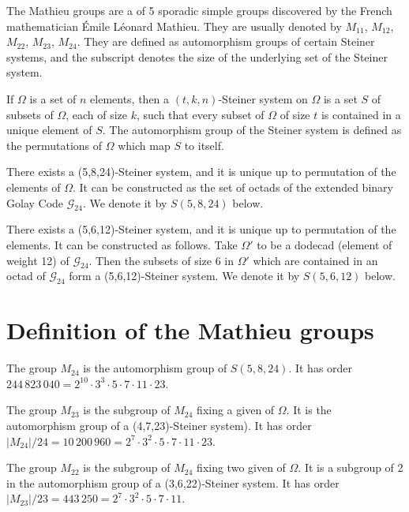 \documentclass[12pt]{article}
\newcommand{\gc}{\mathcal{G}_{24}}
\begin{document}

The Mathieu groups are a  of 5 sporadic simple groups discovered by the French mathematician \'Emile L\'eonard Mathieu.  They are usually denoted by $M_{11}$, $M_{12}$, $M_{22}$, $M_{23}$, $M_{24}$.  They are defined as automorphism groups of certain Steiner systems, and the subscript denotes the size of the underlying set of the Steiner system.

If $\Omega$ is a set of $n$ elements, then a $(t,k,n)$-Steiner system on $\Omega$ is a set $S$ of subsets of $\Omega$, each of size $k$, such that every subset of $\Omega$ of size $t$ is contained in a unique element of $S$.  The automorphism group of the Steiner system is defined as the permutations of $\Omega$ which map $S$ to itself.

There exists a (5,8,24)-Steiner system, and it is unique up to permutation of the elements of $\Omega$.  It can be constructed as the set of octads of the extended binary Golay Code $\gc$.  We denote it by $S(5,8,24)$ below.

There exists a (5,6,12)-Steiner system, and it is unique up to permutation of the elements.  It can be constructed as follows.  Take $\Omega'$ to be a dodecad (element of weight 12) of $\gc$.  Then the subsets of size 6 in $\Omega'$ which are contained in an octad of $\gc$ form a (5,6,12)-Steiner system.  We denote it by $S(5,6,12)$ below.

\section{Definition of the Mathieu groups}

The group $M_{24}$ is the automorphism group of $S(5,8,24)$.  It has order $244\,823\,040 = 2^{10} \cdot 3^3 \cdot 5 \cdot 7 \cdot 11 \cdot 23$.

The group $M_{23}$ is the subgroup of $M_{24}$ fixing a given  of $\Omega$.  It is the automorphism group of a (4,7,23)-Steiner system).  It has order $|M_{24}|/24 = 10\,200\,960 = 2^7 \cdot 3^2 \cdot 5 \cdot 7 \cdot 11 \cdot 23$.  

The group $M_{22}$ is the subgroup of $M_{24}$ fixing two given  of $\Omega$.  It is a subgroup of  2 in the automorphism group of a (3,6,22)-Steiner system.  It has order $|M_{23}|/23 = 443\,250 = 2^7 \cdot 3^2 \cdot 5 \cdot 7 \cdot 11$.
\end{document}
